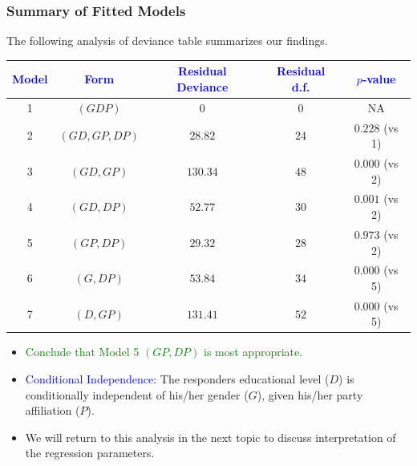 \documentclass[oneside]{book}\usepackage[]{graphicx}\usepackage[svgnames]{xcolor}
\begin{document}
\subsubsection*{Summary of Fitted Models}
The following analysis of deviance table summarizes our findings.
\begin{table}[H]
      \centering
      \begin{tabular}{ccccc}
            \toprule
            \textcolor{Blue}{Model} & \textcolor{Blue}{Form} & \textcolor{Blue}{Residual Deviance} & \textcolor{Blue}{Residual d.f.} & \textcolor{Blue}{$ p $-value} \\
            \midrule
            1                       & $ (GDP) $              & 0                                   & 0                               & NA                            \\
            \midrule
            2                       & $(GD, GP, DP)$         & $28.82$                             & $24$                            & $0.228$ (vs 1)                \\
            \midrule
            3                       & $(GD, GP)$             & $130.34$                            & $48$                            & $0.000$ (vs 2)                \\
            4                       & $(GD, DP)$             & $52.77$                             & $30$                            & $0.001$ (vs 2)                \\
            5                       & $(GP, DP)$             & $29.32$                             & $28$                            & $0.973$ (vs 2)                \\
            \midrule
            6                       & $(G, DP)$              & $53.84$                             & $34$                            & $0.000$ (vs 5)                \\
            7                       & $(D, GP)$              & $131.41$                            & $52$                            & $0.000$ (vs 5)                \\
            \bottomrule
      \end{tabular}
\end{table}
\begin{itemize}
      \item \textcolor{Green}{Conclude that Model 5 $(GP, DP)$ is most appropriate}.
      \item \textcolor{Blue}{Conditional Independence}: The responders educational level ($D$) is conditionally
            independent of his/her gender ($G$), given his/her party affiliation ($P$).
      \item We will return to this analysis in the next topic to discuss interpretation of the
            regression parameters.
\end{itemize}
\end{document}

